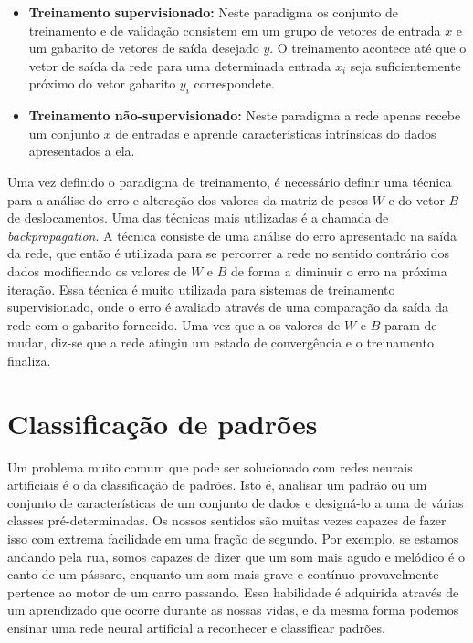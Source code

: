 \begin{itemize}
	\item \textbf{Treinamento supervisionado:} Neste paradigma os conjunto de treinamento e de validação consistem em um grupo de vetores de entrada $x$ e um gabarito de vetores de saída desejado $y$. O treinamento acontece até que o vetor de saída da rede para uma determinada entrada $x_i$ seja suficientemente próximo do vetor gabarito $y_i$ correspondete.
	
	
	\item \textbf{Treinamento não-supervisionado:} Neste paradigma a rede apenas recebe um conjunto $x$ de entradas e aprende características intrínsicas do dados apresentados a ela.
	
\end{itemize}

Uma vez definido o paradigma de treinamento, é necessário definir uma técnica para a análise do erro e alteração dos valores da matriz de pesos $W$ e do vetor $B$ de deslocamentos. Uma das técnicas mais utilizadas é a chamada de \textit{backpropagation}\cite{DeepLearning, ZhangNNSurvey}. A técnica consiste de uma análise do erro apresentado na saída da rede, que então é utilizada para se percorrer a rede no sentido contrário dos dados modificando os valores de $W$ e $B$ de forma a diminuir o erro na próxima iteração. Essa técnica é muito utilizada para sistemas de treinamento supervisionado, onde o erro é avaliado através de uma comparação da saída da rede com o gabarito fornecido. Uma vez que a os valores de $W$ e $B$ param de mudar, diz-se que a rede atingiu um estado de convergência\cite{Kozabov} e o treinamento finaliza.


\section{Classificação de padrões}




Um problema muito comum que pode ser solucionado com redes neurais artificiais é o da classificação de padrões. Isto é, analisar um padrão ou um conjunto de características de um conjunto de dados e designá-lo a uma de várias classes pré-determinadas. Os nossos sentidos são muitas vezes capazes de fazer isso com extrema facilidade em uma fração de segundo. Por exemplo, se estamos andando pela rua, somos capazes de dizer que um som mais agudo e melódico é o canto de um pássaro, enquanto um som mais grave e contínuo provavelmente pertence ao motor de um carro passando. Essa habilidade é adquirida através de um aprendizado que ocorre durante as nossas vidas, e da mesma forma podemos ensinar uma rede neural artificial a reconhecer e classificar padrões.

